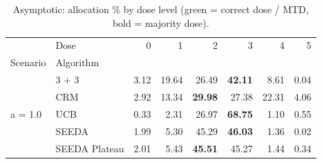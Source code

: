 \begin{table}[H]
\centering
\caption{Asymptotic: allocation \% by dose level (green = correct dose / MTD, bold = majority dose).}
\label{tab:asym_alloc_by_dose}
\begin{tabular}{llrrrrrr}
\toprule
 & Dose & 0 & 1 & 2 & 3 & 4 & 5 \\
Scenario & Algorithm &  &  &  &  &  &  \\
\midrule
\multirow[c]{5}{*}{a = 1.0} & 3 + 3 & 3.12 & 19.64 & {\cellcolor[HTML]{C8E6C9}} 26.49 & \bfseries 42.11 & 8.61 & 0.04 \\
 & CRM & 2.92 & 13.34 & {\cellcolor[HTML]{C8E6C9}} \bfseries 29.98 & 27.38 & 22.31 & 4.06 \\
 & UCB & 0.33 & 2.31 & {\cellcolor[HTML]{C8E6C9}} 26.97 & \bfseries 68.75 & 1.10 & 0.55 \\
 & SEEDA & 1.99 & 5.30 & {\cellcolor[HTML]{C8E6C9}} 45.29 & \bfseries 46.03 & 1.36 & 0.02 \\
 & SEEDA Plateau & 2.01 & 5.43 & {\cellcolor[HTML]{C8E6C9}} \bfseries 45.51 & 45.27 & 1.44 & 0.34 \\
\bottomrule
\end{tabular}
\end{table}
